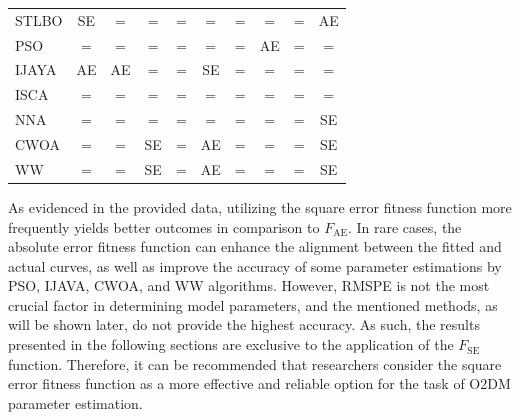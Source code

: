 \documentclass[a4paper,fleqn]{cas-dc}
\begin{document}
\begin{table}[<options>]
\begin{tabular*}{\tblwidth}{@{}LCCCCCCCCC@{}}
STLBO &SE &=  &=  &=  &=  &=  &=  &=  & AE \\
PSO &=  &=  &=  &=  &=  &=  & AE &=  &=  \\
IJAYA & AE & AE & = &=  &SE & = & = &=  &=  \\
ISCA &=  &=  &=  &=  &=  &=  &=  &=  &=  \\
NNA &=  &=  &=  &=  &=  &=  &=  &=  & SE\\
CWOA &=  &=  & SE&=  &  AE&=  &=  &=  &SE \\
WW &=  &=  & SE& = & AE & = &=  &=  & SE\\
\bottomrule
\end{tabular*}
\end{table}

As evidenced in the provided data, utilizing the square error fitness function more frequently yields better outcomes in comparison to $F_\mathrm{AE}$.
In rare cases, the absolute error fitness function can enhance the alignment between the fitted and actual curves,
as well as improve the accuracy of some parameter estimations by PSO, IJAVA, CWOA, and WW algorithms.
However, RMSPE is not the most crucial factor in determining model parameters, and the mentioned methods,
as will be shown later, do not provide the highest accuracy.
As such, the results presented in the following sections are exclusive to the application of the $F_\mathrm{SE}$ function.
Therefore, it can be recommended that researchers consider
the square error fitness function as a more effective and reliable option for the task of O2DM parameter estimation.
\end{document}
